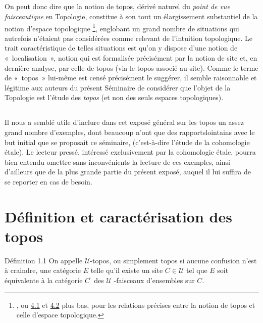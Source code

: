 \documentclass[10pt]{../fichiers-configuration-latex/smfart}
\begin{document}
\subsection{}
On peut donc dire que la notion de topos, dérivé naturel du
\emph{point de vue faisceautique} en Topologie, constitue à son
tout un élargissement substantiel de la notion  d'espace
topologique \footnote[1]{\Cf [9], ou \hyperref[IV.subsec4.1]{4.1} et
\hyperref[IV.subsec4.2]{4.2} plus bas, pour les relations
  précises entre la notion de topos et celle d'espace
  topologique.}, englobant un grand nombre de situations qui
autrefois n'étaient pas considérées comme relevant de
l'intuition topologique. Le trait caractéristique de telles
situations est qu'on y dispose d'une notion de « localisation »,
notion qui est formalisée précisément par la notion de site
et, en dernière analyse, par celle de topos (via le topos
associé au site). Comme le terme de « topos »  lui-même est
censé précisément le suggérer, il semble raisonnable et
légitime aux auteurs du présent Séminaire de considérer que
l'objet de la Topologie est l'étude des \emph{topos} (et non des
seuls espaces topologiques).

\subsection{}
Il nous a semblé utile d'inclure dans cet exposé général sur
les topos un assez grand nombre d'exemples, dont beaucoup n'ont que
des rapports\pageoriginale lointains avec le but initial que se
proposait ce séminaire, (c'est-à-dire l'étude de la
cohomologie étale). Le lecteur pressé, intéressé
exclusivement par la cohomologie étale, pourra bien entendu
omettre sans inconvénients la lecture de ces exemples, ainsi
d'ailleurs que de la plus grande partie du présent exposé,
auquel il lui suffira de se reporter en cas de besoin.

\section{Définition et caractérisation des topos}

\begin{enonce*}{Définition 1.1}
On appelle $𝒰$-topos, ou simplement topos si aucune
confusion n'est à craindre, une catégorie $E$ telle qu'il existe
un site $C\in 𝒰$ tel que $E$ soit équivalente à la
catégorie $C^{\widetilde{\phantom{,}}}$ des $𝒰$ -faisceaux
d'ensembles sur $C$.
\end{enonce*}
\end{document}
